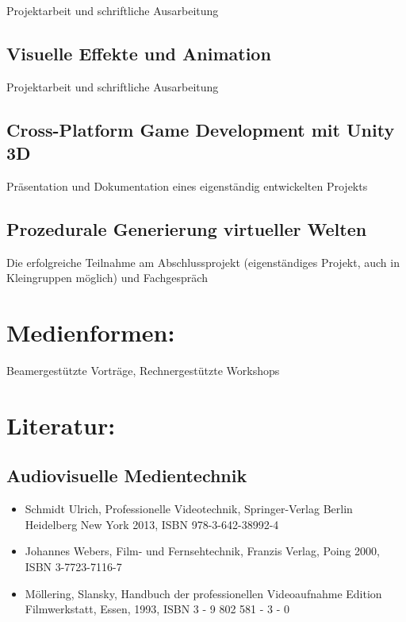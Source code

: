 Projektarbeit und schriftliche Ausarbeitung

\subsection{Visuelle Effekte und
Animation}\label{visuelle-effekte-und-animation-2}

Projektarbeit und schriftliche Ausarbeitung

\subsection{Cross-Platform Game Development mit Unity
3D}\label{cross-platform-game-development-mit-unity-3d-2}

Präsentation und Dokumentation eines eigenständig entwickelten Projekts

\subsection{Prozedurale Generierung virtueller
Welten}\label{prozedurale-generierung-virtueller-welten-2}

Die erfolgreiche Teilnahme am Abschlussprojekt (eigenständiges Projekt,
auch in Kleingruppen möglich) und Fachgespräch

\section{Medienformen:}\label{medienformen-29}

Beamergestützte Vorträge, Rechnergestützte Workshops

\section{Literatur:}\label{literatur-29}

\subsection{Audiovisuelle
Medientechnik}\label{audiovisuelle-medientechnik-3}

\begin{itemize}
\tightlist
\item
  Schmidt Ulrich, Professionelle Videotechnik, Springer-Verlag Berlin
  Heidelberg New York 2013, ISBN 978-3-642-38992-4
\item
  Johannes Webers, Film- und Fernsehtechnik, Franzis Verlag, Poing 2000,
  ISBN 3-7723-7116-7
\item
  Möllering, Slansky, Handbuch der professionellen Videoaufnahme Edition
  Filmwerkstatt, Essen, 1993, ISBN 3 - 9 802 581 - 3 - 0
\end{itemize}

